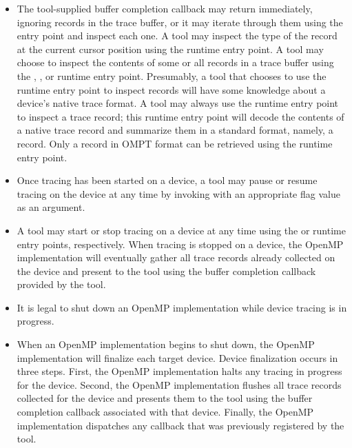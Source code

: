 \begin{itemize}
\item The tool-supplied buffer completion callback may return
  immediately, ignoring records in the trace buffer, or it may iterate
  through them using the  entry
  point
  and inspect each one. A tool may inspect the type of the record at
  the current cursor position using the 
  runtime entry point.  A tool may choose to inspect the contents of some or
  all records in a trace buffer using the ,
  , or
   runtime entry point.  Presumably, a tool that
  chooses to use the  runtime entry point to
  inspect records will have some knowledge about a device's native
  trace format.  A tool may always use the
   runtime entry point to inspect a trace
  record; this runtime entry point will decode the contents of a native trace record
  and summarize them in a standard format, namely, a
   record.
  Only a record in OMPT format can be retrieved using the
   runtime entry point.
\item Once tracing has been started on a device, a tool may pause or resume
  tracing on the device at any time by invoking
   with an appropriate flag value as an
  argument.
\item A tool may start or stop tracing on a device at any time using the
   or  runtime entry points,
  respectively. When tracing is stopped on a device, the OpenMP implementation will eventually
  gather all trace records already collected on the device and present to the tool using
  the buffer completion callback provided by the tool.
\item It is legal to shut down an OpenMP implementation while device tracing
is in progress.
\item When an OpenMP implementation begins to shut down, the OpenMP implementation will
  finalize each target device.  Device finalization occurs in three steps.
  First, the OpenMP implementation halts any tracing in progress for the device. Second,
  the OpenMP implementation flushes all trace records collected for the device and presents them to
  the tool using the buffer completion callback associated with that device.
  Finally, the OpenMP implementation dispatches
  any  callback that was previously
  registered by the tool.

\end{itemize}


